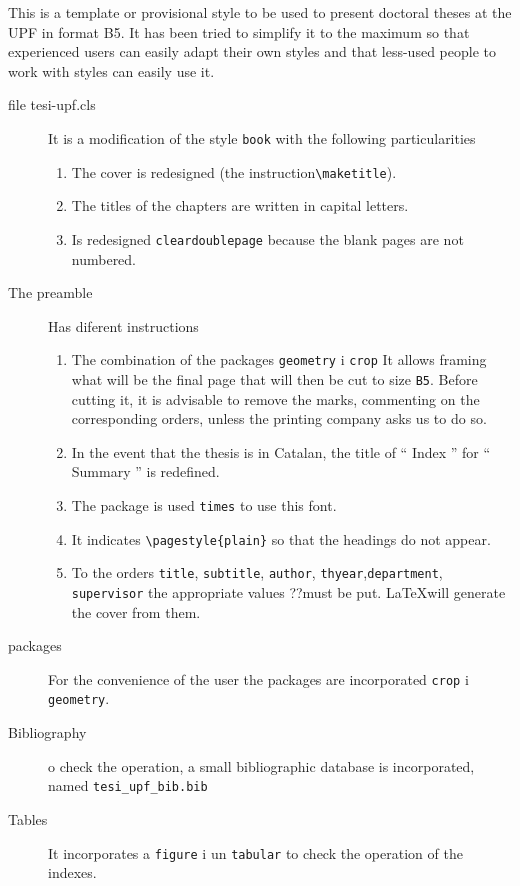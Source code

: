 This is a template or provisional style to be used to present doctoral theses at the UPF in format B5. It has been tried to simplify it to the maximum so that experienced users can easily adapt their own styles and that less-used people to work with styles can easily use it. 

\begin{description}
\item[file tesi-upf.cls] It is a modification of the style {\tt book} with the following particularities
  \begin{enumerate}
  \item The cover is redesigned (the instruction\verb+\maketitle+).

  \item The titles of the chapters are written in capital letters.

  \item Is redesigned {\tt cleardoublepage} because the blank pages are not numbered.
  \end{enumerate}

\item[The preamble] Has diferent instructions
  \begin{enumerate}
  \item The combination of the packages {\tt geometry} i {\tt crop} It allows framing what will be the final page that will then be cut to size {\tt B5}. Before cutting it, it is advisable to remove the marks, commenting on the corresponding orders, unless the printing company asks us to do so.

  \item In the event that the thesis is in Catalan, the title of `` Index '' for `` Summary '' is redefined.

  \item The package is used {\tt times} to use this font.

  \item It indicates \verb+\pagestyle{plain}+ so that the headings do not appear.

  \item  To the orders {\tt title}, {\tt subtitle}, {\tt author}, {\tt thyear},{\tt department}, {\tt supervisor} the appropriate values ??must be put. \LaTeX will generate the cover from them.
  \end{enumerate}

\item[packages] For the convenience of the user the packages are incorporated {\tt crop} i {\tt geometry}. 

\item[Bibliography] o check the operation, a small bibliographic database is incorporated, named  \verb+tesi_upf_bib.bib+


\item[Tables] It incorporates a \verb+figure+ i un \verb+tabular+ to check the operation of the indexes.

\end{description}


